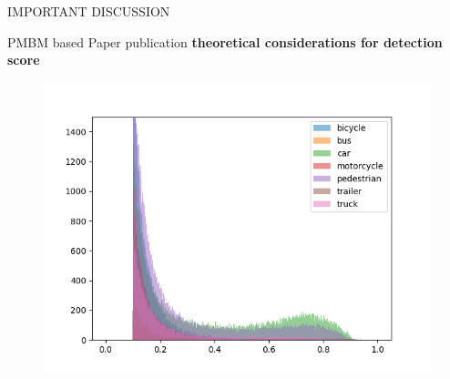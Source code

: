 \documentclass[aspectratio=169,xcolor=dvipsnames]{beamer}
\begin{document}
\begin{frame}{IMPORTANT DISCUSSION}


\begin{block}{PMBM based Paper publication}
    \textbf{theoretical considerations for detection score}
\end{block}

\begin{figure}
    \includegraphics[width=0.4\linewidth]{pmbm/plot_all.png}
\end{figure}
\end{frame}
\end{document}
